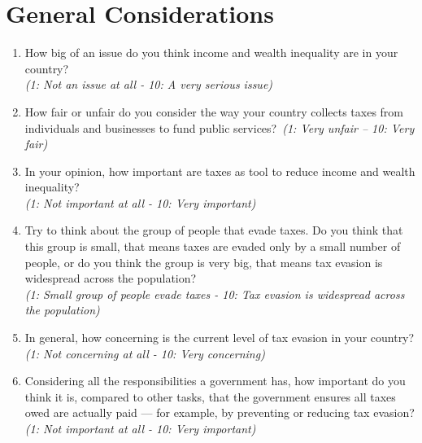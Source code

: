 \documentclass[11pt]{article}
\begin{document}
\section*{General Considerations}
\begin{enumerate}[resume]
    \item How big of an issue do you think income and wealth inequality are in your country?\\
    \textit{(1: Not an issue at all - 10: A very serious issue)}
    \item How fair or unfair do you consider the way your country collects taxes from individuals and businesses to fund public services?\
    \textit{(1: Very unfair – 10: Very fair)}
    \item In your opinion, how important are taxes as tool to reduce income and wealth inequality?\\
    \textit{(1: Not important at all - 10: Very important)}
    \item Try to think about the group of people that evade taxes. Do you think that this group is small, that means taxes are evaded only by a small number of people, or do you think the group is very big, that means tax evasion is widespread across the population?  \\
    \textit{(1: Small group of people evade taxes - 10: Tax evasion is widespread across the population)}
    \item In general, how concerning is the current level of tax evasion in your country?\\
    \textit{(1: Not concerning at all - 10: Very concerning)}
    \item Considering all the responsibilities a government has, how important do you think it is, compared to other tasks, that the government ensures all taxes owed are actually paid — for example, by preventing or reducing tax evasion?\\
    \textit{(1: Not important at all  - 10: Very important)}
\end{enumerate}
\end{document}

